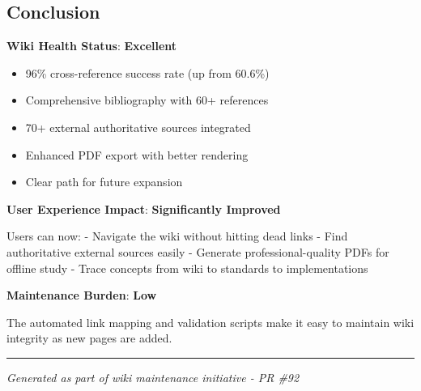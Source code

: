 \subsection{Conclusion}\label{conclusion}

\textbf{Wiki Health Status}: \textbf{Excellent}

\begin{itemize}
\tightlist
\item
  96\% cross-reference success rate (up from 60.6\%)
\item
  Comprehensive bibliography with 60+ references
\item
  70+ external authoritative sources integrated
\item
  Enhanced PDF export with better rendering
\item
  Clear path for future expansion
\end{itemize}

\textbf{User Experience Impact}: \textbf{Significantly Improved}

Users can now: - Navigate the wiki without hitting dead links - Find
authoritative external sources easily - Generate professional-quality
PDFs for offline study - Trace concepts from wiki to standards to
implementations

\textbf{Maintenance Burden}: \textbf{Low}

The automated link mapping and validation scripts make it easy to
maintain wiki integrity as new pages are added.

\begin{center}\rule{0.5\linewidth}{0.5pt}\end{center}

\emph{Generated as part of wiki maintenance initiative - PR \#92}
